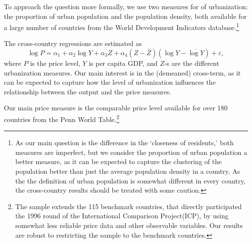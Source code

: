 \documentclass[12pt]{article}
\begin{document}
To approach the question more formally, we use two measures for of urbanization: the proportion of urban population and the population density, both available for a large number of countries from the World Development Indicators database.\footnote{As our main question is the difference in the `closeness of residents,' both measures are imperfect, but we consider the proportion of urban population a better measure, as it can be expected to capture the clustering of the population better than just the average population density in a country. As the the definition of urban population is somewhat different in every country, the cross-country results should be treated with some caution.}

The cross-country regressions are estimated as
\begin{equation}
\log{P}=\alpha_1+\alpha_2\log Y+\alpha_3Z+\alpha_4(Z-\bar{Z})(\log Y-\overline{\log Y})+\varepsilon,
\end{equation}
where $P$ is the price level, $Y$ is per capita GDP, and $Z$-s are the different urbanization measures. Our main interest is in the (demeaned) cross-term, as it can be expected to capture how the level of urbanization influences the relationship between the output and the price measures.

Our main price measure is the comparable price level available for
over 180 countries from the Penn World Table.\footnote{The sample
extends the 115 benchmark countries, that directly participated the
1996 round of the International Comparison Project(ICP), by using
somewhat less reliable price data and other observable variables.
Our results are robust to restricting the sample to the benchmark
countries.}
\end{document}
